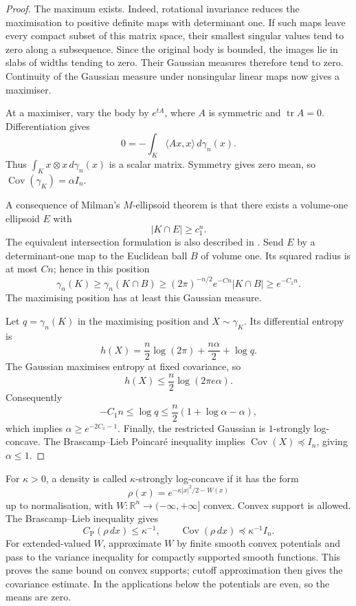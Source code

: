 \documentclass[11pt]{amsart}
\numberwithin{equation}{section}
\theoremstyle{definition}
\theoremstyle{remark}
\newcommand{\R}{\mathbb R}
\newcommand{\Id}{I_n}
\newcommand{\gam}{\gamma_n}
\newcommand{\CP}{C_{\mathrm P}}
\DeclareMathOperator{\Cov}{Cov}
\DeclareMathOperator{\tr}{tr}
\begin{document}
\begin{proof}
The maximum exists. Indeed, rotational invariance reduces the
maximisation to positive definite maps with determinant one. If such
maps leave every compact subset of this matrix space, their smallest
singular values tend to zero along a subsequence. Since the original
body is bounded, the images lie in slabs of widths tending to zero.
Their Gaussian measures therefore tend to zero. Continuity of the
Gaussian measure under nonsingular linear maps now gives a maximiser.

At a maximiser, vary the body by \(e^{tA}\), where \(A\) is symmetric
and \(\tr A=0\). Differentiation gives
\[
0=-\int_K\langle Ax,x\rangle\,d\gam(x).
\]
Thus \(\int_K x\otimes x\,d\gam(x)\) is a scalar matrix. Symmetry gives
zero mean, so \(\Cov(\gamma_K)=\alpha\Id\).

A consequence of Milman's \(M\)-ellipsoid theorem \cite{Mil86} is that
there exists a volume-one ellipsoid \(E\) with
\[
|K\cap E|\ge c_1^n.
\]
The equivalent intersection formulation is also described in
\cite[Corollary~2.3]{Bob11}. Send \(E\) by a determinant-one map to the
Euclidean ball \(B\) of volume one. Its squared radius is at most \(Cn\);
hence in this position
\[
\gam(K)\ge \gam(K\cap B)
\ge (2\pi)^{-n/2}e^{-Cn}|K\cap B|
\ge e^{-C_1n}.
\]
The maximising position has at least this Gaussian measure.

Let \(q=\gam(K)\) in the maximising position and \(X\sim\gamma_K\).
Its differential entropy is
\[
h(X)=\frac n2\log(2\pi)+\frac{n\alpha}{2}+\log q.
\]
The Gaussian maximises entropy at fixed covariance, so
\[
h(X)\le\frac n2\log(2\pi e\alpha).
\]
Consequently
\[
-C_1n\le\log q
\le\frac n2(1+\log\alpha-\alpha),
\]
which implies \(\alpha\ge e^{-2C_1-1}\).
Finally, the restricted Gaussian is \(1\)-strongly log-concave.
The Brascamp--Lieb Poincar\'e inequality implies
\(\Cov(X)\preceq\Id\), giving \(\alpha\le1\).
\end{proof}

For \(\kappa>0\), a density is called \(\kappa\)-strongly log-concave if
it has the form
\[
\rho(x)=e^{-\kappa|x|^2/2-W(x)}
\]
up to normalisation, with \(W:\R^n\to(-\infty,+\infty]\) convex.
Convex support is allowed. The Brascamp--Lieb inequality
\cite{BL76} gives
\begin{equation}\label{eq:strong-lc-poincare}
\CP(\rho\,dx)\le\kappa^{-1},
\qquad
\Cov(\rho\,dx)\preceq\kappa^{-1}\Id.
\end{equation}
For extended-valued \(W\), approximate \(W\) by finite smooth convex
potentials and pass to the variance inequality for compactly supported
smooth functions. This proves the same bound on convex supports; cutoff
approximation then gives the covariance estimate. In the applications
below the potentials are even, so the means are zero.
\end{document}
